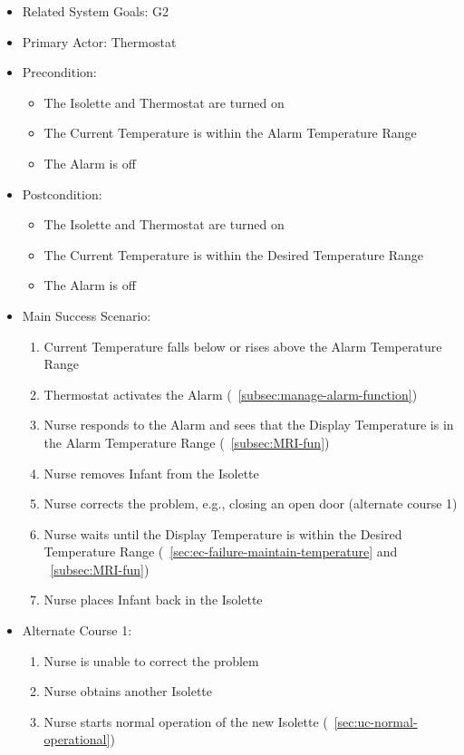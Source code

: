 \begin{itemize}
\item Related System Goals: G2
\item Primary Actor: Thermostat
\item Precondition:
  \begin{itemize}
  \item The Isolette and Thermostat are turned on
  \item The Current Temperature is within the Alarm Temperature Range
  \item The Alarm is off
  \end{itemize}
\item Postcondition:
  \begin{itemize}
  \item The Isolette and Thermostat are turned on
  \item The Current Temperature is within the Desired Temperature Range
  \item The Alarm is off
  \end{itemize}
\item Main Success Scenario:
  \begin{enumerate}
  \item Current Temperature falls below or rises above the Alarm Temperature Range
  \item Thermostat activates the Alarm (~\ref{subsec:manage-alarm-function})
  \item Nurse responds to the Alarm and sees that the Display Temperature is in the
        Alarm Temperature Range (~\ref{subsec:MRI-fun})
  \item Nurse removes Infant from the Isolette
  \item Nurse corrects the problem, e.g., closing an open door (alternate course 1)
  \item Nurse waits until the Display Temperature is within the Desired Temperature
        Range (~\ref{sec:ec-failure-maintain-temperature} and ~\ref{subsec:MRI-fun})
  \item Nurse places Infant back in the Isolette
  \end{enumerate}
\item Alternate Course 1:
  \begin{enumerate}
  \item Nurse is unable to correct the problem
  \item Nurse obtains another Isolette
  \item Nurse starts normal operation of the new Isolette (~\ref{sec:uc-normal-operational})
  \end{enumerate}
\end{itemize}

